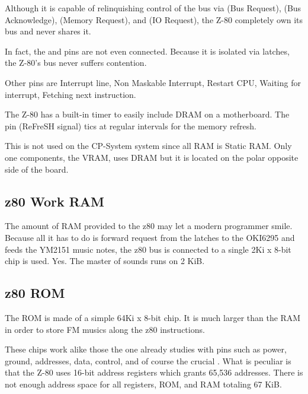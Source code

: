 Although it is capable of relinquishing control of the bus via  (Bus Request),  (Bus Acknowledge),  (Memory Request), and  (IO Request), the Z-80 completely own its bus and never shares it. 

In fact, the  and  pins are not even connected.  Because it is isolated via latches, the Z-80's bus never suffers contention.


Other pins are  Interrupt line,  Non Maskable Interrupt,  Restart CPU,  Waiting for interrupt,  Fetching next instruction.

 The Z-80 has a built-in timer to easily include DRAM on a motherboard. The  pin (ReFreSH signal) tics at regular intervals for the memory refresh.

 This is not used on the CP-System system since all RAM is Static RAM. Only one components, the VRAM, uses DRAM but it is located on the polar opposite side of the board.

\pagebreak

\subsection{z80 Work RAM}
The amount of RAM provided to the z80 may let a modern programmer smile. Because all it has to do is forward request from the latches to the OKI6295 and feeds the YM2151 music notes, the z80 bus is connected to a single 2Ki x 8-bit  chip is used. Yes. The master of sounds runs on 2 KiB.

\subsection{z80 ROM}
The ROM is made of a simple 64Ki x 8-bit  chip. It is much larger than the RAM in order to store FM musics along the z80 instructions. 



These chips work alike those the one already studies with pins such as power, ground, addresses, data, control, and of course the crucial . What is peculiar is that the Z-80 uses 16-bit address registers which grants 65,536 addresses. There is not enough address space for all registers, ROM, and RAM totaling 67 KiB.

